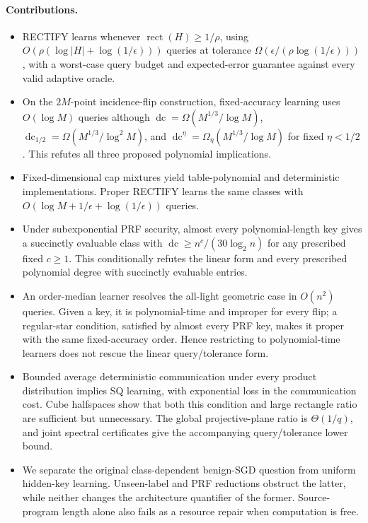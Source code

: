 \documentclass[11pt]{article}
\DeclareMathOperator{\dc}{dc}
\DeclareMathOperator{\rect}{rect}
\newcommand{\1}{\mathbf 1}
\begin{document}
\paragraph{Contributions.}
\begin{itemize}
\item RECTIFY learns whenever $\rect(H)\ge1/\rho$, using $O(\rho(\log|H|+\log(1/\epsilon)))$ queries at tolerance $\Omega(\epsilon/(\rho\log(1/\epsilon)))$, with a worst-case query budget and expected-error guarantee against every valid adaptive oracle.
\item On the $2M$-point incidence-flip construction, fixed-accuracy learning uses $O(\log M)$ queries although $\dc=\Omega(M^{1/3}/\log M)$, $\dc_{1/2}=\Omega(M^{1/3}/\log^2M)$, and $\dc^\eta=\Omega_\eta(M^{1/3}/\log M)$ for fixed $\eta<1/2$. This refutes all three proposed polynomial implications.
\item Fixed-dimensional cap mixtures yield table-polynomial and deterministic implementations. Proper RECTIFY learns the same classes with $O(\log M+1/\epsilon+\log(1/\epsilon))$ queries.
\item Under subexponential PRF security, almost every polynomial-length key gives a succinctly evaluable class with $\dc\ge n^c/(30\log_2n)$ for any prescribed fixed $c\ge1$. This conditionally refutes the linear form and every prescribed polynomial degree with succinctly evaluable entries.
\item An order-median learner resolves the all-light geometric case in $O(n^2)$ queries. Given a key, it is polynomial-time and improper for every flip; a regular-star condition, satisfied by almost every PRF key, makes it proper with the same fixed-accuracy order. Hence restricting to polynomial-time learners does not rescue the linear query/tolerance form.
\item Bounded average deterministic communication under every product distribution implies SQ learning, with exponential loss in the communication cost. Cube halfspaces show that both this condition and large rectangle ratio are sufficient but unnecessary. The global projective-plane ratio is $\Theta(1/q)$, and joint spectral certificates give the accompanying query/tolerance lower bound.
\item We separate the original class-dependent benign-SGD question from uniform hidden-key learning. Unseen-label and PRF reductions obstruct the latter, while neither changes the architecture quantifier of the former. Source-program length alone also fails as a resource repair when computation is free.
\end{itemize}
\end{document}
